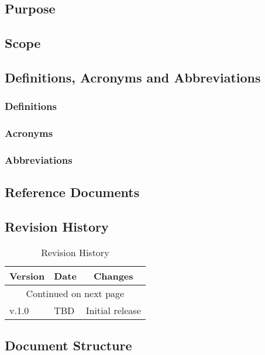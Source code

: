 \subsection{Purpose}

\subsection{Scope}

\subsection{Definitions, Acronyms and Abbreviations}

\subsubsection{Definitions}

\subsubsection{Acronyms}

\subsubsection{Abbreviations}


\subsection{Reference Documents}

\clearpage
\subsection{Revision History}
\begin{center}
\begin{longtable}{|p{2cm} | p{3cm}| p{8cm}|}
\hline \multicolumn{1}{|c|}{\textbf{Version}} & \multicolumn{1}{c|}{\textbf{Date}} & \multicolumn{1}{c|}{\textbf{Changes}} \\ \hline 
\endfirsthead
\hline
\endhead
\hline \multicolumn{3}{c}{{Continued on next page}} \\
\endfoot
\hline
\caption{Revision History}
\label{ref:revision}
\endlastfoot
v.1.0 & TBD & Initial release \\ 
\end{longtable}
\end{center}

\subsection{Document Structure}
